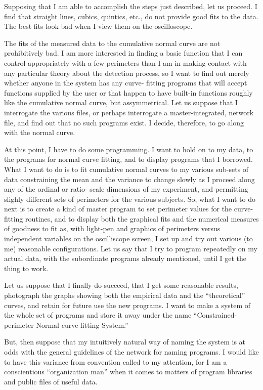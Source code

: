 \documentclass{article}
\begin{document}
Supposing that I am able to accomplish the steps just described, let us proceed. I find that straight lines, cubics, quintics, etc., do not provide good fits to the data. The best fits look bad when I view them on the oscilloscope.

The fits of the measured data to the cumulative normal curve are not prohibitively bad. I am more interested in finding a basic function that I can control appropriately with a few perimeters than I am in making contact with any particular theory about the detection process, so I want to find out merely whether anyone in the system has any curve- fitting programs that will accept functions supplied by the user or that happen to have built-in functions roughly like the cumulative normal curve, but assymmetrical. Let us suppose that I interrogate the various files, or perhaps interrogate a master-integrated, network file, and find out that no such programs exist. I decide, therefore, to go along with the normal curve.

At this point, I have to do some programming. I want to hold on to my data, to the programs for normal curve fitting, and to display programs that I borrowed. What I want to do is to fit cumulative normal curves to my various sub-sets of data constraining the mean and the variance to change slowly as I proceed along any of the ordinal or ratio- scale dimensions of my experiment, and permitting slighly different sets of perimeters for the various subjects. So, what I want to do next is to create a kind of master program to set perimeter values for the curve-fitting routines, and to display both the graphical fits and the numerical measures of goodness to fit as, with light-pen and graphics of perimeters versus independent variables on the oscilliscope screen, I set up and try out various (to me) reasonable configurations. Let us say that I try to program repeatedly on my actual data, with the subordinate programs already mentioned, until I get the thing to work.

Let us suppose that I finally do succeed, that I get some reasonable results, photograph the graphs showing both the empirical data and the ``theoretical'' curves, and retain for future use the new programs. I want to make a system of the whole set of programs and store it away under the name ``Constrained-perimeter Normal-curve-fitting System.''

But, then suppose that my intuitively natural way of naming the system is at odds with the general guidelines of the network for naming programs. I would like to have this variance from convention called to my attention, for I am a conscientious ``organization man'' when it comes to matters of program libraries and public files of useful data.
\end{document}
